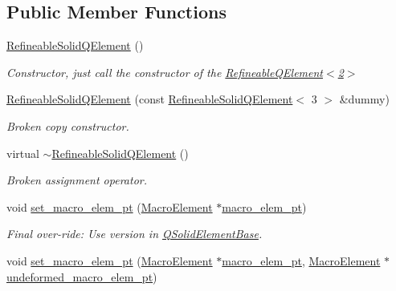 \subsection*{Public Member Functions}
\begin{DoxyCompactItemize}
\item 
\hyperlink{classoomph_1_1RefineableSolidQElement_3_013_01_4_a2ed2ea0f307ab12940b058734a428eea}{Refineable\+Solid\+Q\+Element} ()
\begin{DoxyCompactList}\small\item\em Constructor, just call the constructor of the \hyperlink{classoomph_1_1RefineableQElement_3_012_01_4}{Refineable\+Q\+Element$<$2$>$} \end{DoxyCompactList}\item 
\hyperlink{classoomph_1_1RefineableSolidQElement_3_013_01_4_a814ca5f2d10f67a9429edd416d394f27}{Refineable\+Solid\+Q\+Element} (const \hyperlink{classoomph_1_1RefineableSolidQElement}{Refineable\+Solid\+Q\+Element}$<$ 3 $>$ \&dummy)
\begin{DoxyCompactList}\small\item\em Broken copy constructor. \end{DoxyCompactList}\item 
virtual \hyperlink{classoomph_1_1RefineableSolidQElement_3_013_01_4_adae9e315add1f710adb04beb738fa4f9}{$\sim$\+Refineable\+Solid\+Q\+Element} ()
\begin{DoxyCompactList}\small\item\em Broken assignment operator. \end{DoxyCompactList}\item 
void \hyperlink{classoomph_1_1RefineableSolidQElement_3_013_01_4_a2b1aa7874048e0f38370ae7bf761d315}{set\+\_\+macro\+\_\+elem\+\_\+pt} (\hyperlink{classoomph_1_1MacroElement}{Macro\+Element} $\ast$\hyperlink{classoomph_1_1FiniteElement_aa8bce95f69e3199a508672eea7ecc226}{macro\+\_\+elem\+\_\+pt})
\begin{DoxyCompactList}\small\item\em Final over-\/ride\+: Use version in \hyperlink{classoomph_1_1QSolidElementBase}{Q\+Solid\+Element\+Base}. \end{DoxyCompactList}\item 
void \hyperlink{classoomph_1_1RefineableSolidQElement_3_013_01_4_ab2c2950454d7c4ea16a597192c7fae15}{set\+\_\+macro\+\_\+elem\+\_\+pt} (\hyperlink{classoomph_1_1MacroElement}{Macro\+Element} $\ast$\hyperlink{classoomph_1_1FiniteElement_aa8bce95f69e3199a508672eea7ecc226}{macro\+\_\+elem\+\_\+pt}, \hyperlink{classoomph_1_1MacroElement}{Macro\+Element} $\ast$\hyperlink{classoomph_1_1SolidFiniteElement_a20517d8d6ba84c8e90d880f38310915f}{undeformed\+\_\+macro\+\_\+elem\+\_\+pt})

\end{DoxyCompactItemize}

